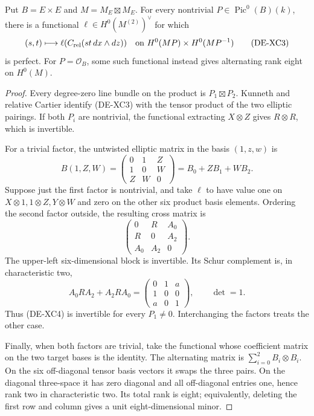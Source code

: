 \begin{lemma}
\label{lem:DE-SS-cross-product}
Put \(B=E\times E\) and \(M=M_E\boxtimes M_E\).
For every nontrivial \(P\in\operatorname{Pic}^0(B)(k)\),
there is a functional \(\ell\in H^0(M^{(2)})^\vee\)
for which
\[
 (s,t)\longmapsto\ell(C_{\rm rel}(st\,dx\wedge dz))
 \quad\text{on }H^0(MP)\times H^0(MP^{-1})
                                                               \tag{DE-XC3}
\]
is perfect. For \(P=\mathcal O_B\), some such functional
instead gives alternating rank eight on \(H^0(M)\).
\end{lemma}
\begin{proof}
Every degree-zero line bundle on the product is
\(P_1\boxtimes P_2\). Kunneth and relative Cartier identify
(DE-XC3) with the tensor product of the two elliptic pairings.
If both \(P_i\) are nontrivial, the functional extracting
\(X\otimes Z\) gives \(R\otimes R\), which is invertible.

For a trivial factor, the untwisted elliptic matrix in the
basis \((1,z,w)\) is
\[
 B(1,Z,W)=
 \begin{pmatrix}0&1&Z\\1&0&W\\Z&W&0\end{pmatrix}
       =B_0+ZB_1+WB_2.
\]
Suppose just the first factor is nontrivial, and take \(\ell\)
to have value one on \(X\otimes1,1\otimes Z,Y\otimes W\)
and zero on the other six product basis elements. Ordering
the second factor outside, the resulting cross matrix is
\[
 \begin{pmatrix}0&R&A_0\\R&0&A_2\\A_0&A_2&0\end{pmatrix}.
                                                               \tag{DE-XC4}
\]
The upper-left six-dimensional block is invertible. Its
Schur complement is, in characteristic two,
\[
 A_0RA_2+A_2RA_0=
 \begin{pmatrix}0&1&a\\1&0&0\\a&0&1\end{pmatrix},
 \qquad \det=1.                                      \tag{DE-XC5}
\]
Thus (DE-XC4) is invertible for every \(P_1\ne0\).
Interchanging the factors treats the other case.

Finally, when both factors are trivial, take the functional
whose coefficient matrix on the two target bases is the identity.
The alternating matrix is \(\sum_{i=0}^2 B_i\otimes B_i\).
On the six off-diagonal tensor basis vectors it swaps the three
pairs. On the diagonal three-space it has zero diagonal and
all off-diagonal entries one, hence rank two in characteristic
two. Its total rank is eight; equivalently, deleting the first
row and column gives a unit eight-dimensional minor.
\end{proof}

